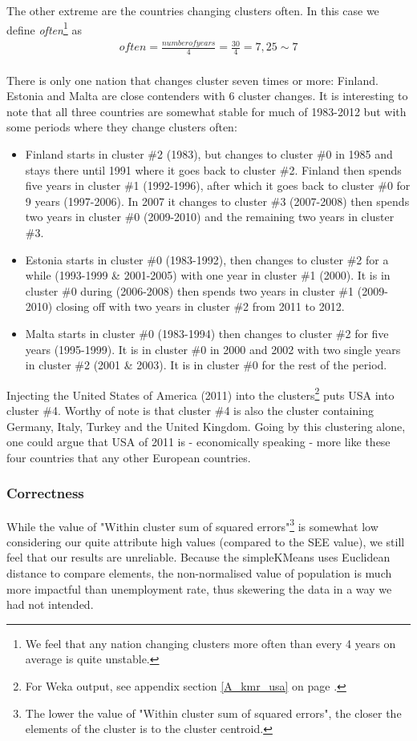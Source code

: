 The other extreme are the countries changing clusters often. In this case we define \textit{often}\footnote{We feel that any nation changing clusters more often than every 4 years on average is quite unstable.} as 
\begin{align*}
often = \frac{number of years}{4} = \frac{30}{4} = 7,25 \sim 7
\end{align*} 
\\There is only one nation that changes cluster seven times or more: Finland. Estonia and Malta are close contenders with 6 cluster changes. It is interesting to note that all three countries are somewhat stable for much of 1983-2012 but with some periods where they change clusters often:

\begin{itemize}
\item Finland starts in cluster \#2 (1983), but changes to cluster \#0 in 1985 and stays there until 1991 where it goes back to cluster \#2. Finland then spends five years in cluster \#1 (1992-1996), after which it goes back to cluster \#0 for 9 years (1997-2006). In 2007 it changes to cluster \#3 (2007-2008) then spends two years in cluster \#0 (2009-2010) and the remaining two years in cluster \#3. 
\item Estonia starts in cluster \#0 (1983-1992), then changes to cluster \#2 for a while (1993-1999 \& 2001-2005) with one year in cluster \#1 (2000). It is in cluster \#0 during (2006-2008) then spends two years in cluster \#1 (2009-2010) closing off with two years in cluster \#2 from 2011 to 2012.
\item Malta starts in cluster \#0 (1983-1994) then changes to cluster \#2 for five years (1995-1999). It is in cluster \#0 in 2000 and 2002 with two single years in cluster \#2 (2001 \& 2003). It is in cluster \#0 for the rest of the period.
\end{itemize}

Injecting the United States of America (2011) into the clusters\footnote{For Weka output, see appendix section \ref{A_kmr_usa} on page \pageref{A_kmr_usa}.} puts USA into cluster \#4. Worthy of note is that cluster \#4 is also the cluster containing Germany, Italy, Turkey and the United Kingdom. Going by this clustering alone, one could argue that USA of 2011 is - economically speaking - more like these four countries that any other European countries.

\subsubsection*{Correctness}
\label{Res_Clu_Cor}
While the value of "Within cluster sum of squared errors"\footnote{The lower the value of "Within cluster sum of squared errors", the closer the elements of the cluster is to the cluster centroid.} is somewhat low considering our quite attribute high values (compared to the SEE value), we still feel that our results are unreliable. Because the simpleKMeans uses Euclidean distance to compare elements, the non-normalised value of population is much more impactful than unemployment rate, thus skewering the data in a way we had not intended.